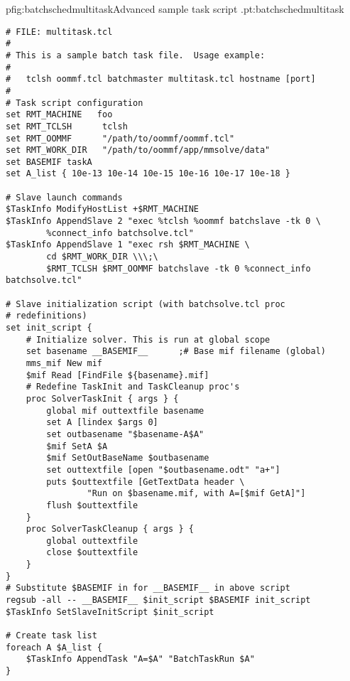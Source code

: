 \begin{codelisting}{p}{fig:batchschedmultitask}{Advanced sample task
script .}{pt:batchschedmultitask}
\begin{verbatim}
# FILE: multitask.tcl
#
# This is a sample batch task file.  Usage example:
#
#   tclsh oommf.tcl batchmaster multitask.tcl hostname [port]
#
# Task script configuration
set RMT_MACHINE   foo 
set RMT_TCLSH      tclsh
set RMT_OOMMF      "/path/to/oommf/oommf.tcl"
set RMT_WORK_DIR   "/path/to/oommf/app/mmsolve/data"
set BASEMIF taskA
set A_list { 10e-13 10e-14 10e-15 10e-16 10e-17 10e-18 }

# Slave launch commands
$TaskInfo ModifyHostList +$RMT_MACHINE
$TaskInfo AppendSlave 2 "exec %tclsh %oommf batchslave -tk 0 \
        %connect_info batchsolve.tcl"
$TaskInfo AppendSlave 1 "exec rsh $RMT_MACHINE \
        cd $RMT_WORK_DIR \\\;\
        $RMT_TCLSH $RMT_OOMMF batchslave -tk 0 %connect_info batchsolve.tcl"

# Slave initialization script (with batchsolve.tcl proc
# redefinitions)
set init_script {
    # Initialize solver. This is run at global scope
    set basename __BASEMIF__      ;# Base mif filename (global)
    mms_mif New mif
    $mif Read [FindFile ${basename}.mif]
    # Redefine TaskInit and TaskCleanup proc's
    proc SolverTaskInit { args } {
        global mif outtextfile basename
        set A [lindex $args 0]
        set outbasename "$basename-A$A"
        $mif SetA $A
        $mif SetOutBaseName $outbasename
        set outtextfile [open "$outbasename.odt" "a+"]
        puts $outtextfile [GetTextData header \
                "Run on $basename.mif, with A=[$mif GetA]"]
        flush $outtextfile
    }
    proc SolverTaskCleanup { args } {
        global outtextfile
        close $outtextfile
    }
}
# Substitute $BASEMIF in for __BASEMIF__ in above script
regsub -all -- __BASEMIF__ $init_script $BASEMIF init_script
$TaskInfo SetSlaveInitScript $init_script

# Create task list
foreach A $A_list {
    $TaskInfo AppendTask "A=$A" "BatchTaskRun $A"
}
\end{verbatim}
\end{codelisting}

\setcounter{secnumdepth}{\value{msoldsecnumdepth}}
